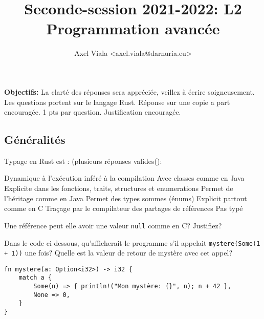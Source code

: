 \documentclass[11pt,a4paper,addpoint]{exam}
\author{\normalsize{Axel Viala <axel.viala@darnuria.eu>}}
\title{\normalsize{\textbf{Seconde-session 2021-2022: L2 Programmation avancée}}}
\begin{document}
  \maketitle
  \begin{multicols}{2}

  \end{multicols}
  \textbf{Objectifs:} La clarté des réponses sera appréciée, veillez à écrire soigneusement. Les questions portent sur le langage Rust. Réponse sur une copie a part encouragée. 1 pts par question. Justification encouragée.
  \begin{questions}
    \section{Généralités}


\question[1] Typage en Rust est : (plusieurs réponses valides():
\begin{multicols}{2}
\begin{checkboxes}
    \choice Dynamique à l'exécution
    \CorrectChoice inféré à la compilation
    \choice Avec classes comme en Java
    \CorrectChoice Explicite dans les fonctions, traits, structures et enumerations
    \choice Permet de l’héritage comme en Java
    \CorrectChoice Permet des types sommes (énums)
    \choice Explicit partout comme en C
    \CorrectChoice Traçage par le compilateur des partages de références
    \choice Pas typé
\end{checkboxes}
\end{multicols}

\question[1] Une référence peut elle avoir une valeur \texttt{null} comme en C? Justifiez?
\vspace{1in}

\question[1] Dans le code ci dessous, qu'afficherait le
programme s'il appelait \texttt{mystere(Some(1 + 1))} une fois? Quelle est la valeur de retour de mystère avec cet appel?
\begin{verbatim}
fn mystere(a: Option<i32>) -> i32 {
    match a {
        Some(n) => { println!("Mon mystère: {}", n); n + 42 },
        None => 0,
    }
}
\end{verbatim}
\vspace{1in}


\end{questions}
\end{document}
